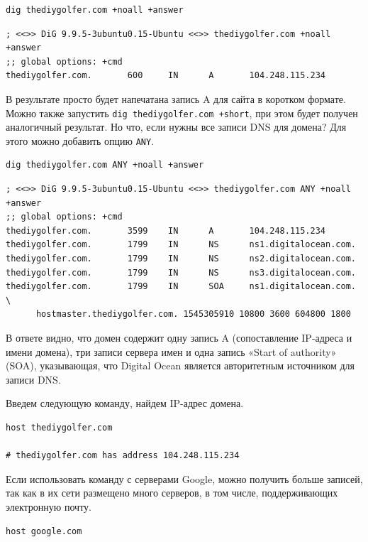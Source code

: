 \documentclass[12pt]{article}
\begin{document}
\begin{verbatim}
dig thediygolfer.com +noall +answer
\end{verbatim}

\begin{verbatim}
; <<>> DiG 9.9.5-3ubuntu0.15-Ubuntu <<>> thediygolfer.com +noall +answer
;; global options: +cmd
thediygolfer.com.       600     IN      A       104.248.115.234
\end{verbatim}

В результате просто будет напечатана запись A для сайта в коротком
формате. Можно также запустить \texttt{dig\ thediygolfer.com\ +short},
при этом будет получен аналогичный результат. Но что, если нужны все
записи DNS для домена? Для этого можно добавить опцию \texttt{ANY}.

\begin{verbatim}
dig thediygolfer.com ANY +noall +answer
\end{verbatim}

\begin{verbatim}
; <<>> DiG 9.9.5-3ubuntu0.15-Ubuntu <<>> thediygolfer.com ANY +noall +answer
;; global options: +cmd
thediygolfer.com.       3599    IN      A       104.248.115.234
thediygolfer.com.       1799    IN      NS      ns1.digitalocean.com.
thediygolfer.com.       1799    IN      NS      ns2.digitalocean.com.
thediygolfer.com.       1799    IN      NS      ns3.digitalocean.com.
thediygolfer.com.       1799    IN      SOA     ns1.digitalocean.com. \
      hostmaster.thediygolfer.com. 1545305910 10800 3600 604800 1800
\end{verbatim}

В ответе видно, что домен содержит одну запись A (сопоставление
IP-адреса и имени домена), три записи сервера имен и одна запись «Start
of authority» (SOA), указывающая, что Digital Ocean является
авторитетным источником для записи DNS.

Введем следующую команду, найдем IP-адрес домена.

\begin{verbatim}
host thediygolfer.com

# thediygolfer.com has address 104.248.115.234
\end{verbatim}

Если использовать команду с серверами Google, можно получить больше
записей, так как в их сети размещено много серверов, в том числе,
поддерживающих электронную почту.

\begin{verbatim}
host google.com
\end{verbatim}
\end{document}
